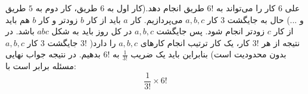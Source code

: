         \p
علی
$6$
کار را می‌تواند به
$6!$
طریق انجام دهد.(کار اول به
$6$
طریق، کار دوم به
$5$
طریق و ...) حال به جایگشت
$3$
کار
$a, b, c$
می‌پردازیم. کار
$a$
باید از کار
$b$
زودتر و کار
$b$
هم باید از کار
$c$
زودتر انجام شود. پس جایگشت
$a, b, c$
در کل روز باید به شکل
$abc$
باشد. در نتیجه از هر
$3!$
کار، یک کار ترتیب انجام کارهای
$a, b, c$
را دارد(
$3!$
جایگشت
$3$
کار
$a, b, c$
بدون محدودیت است) بنابراین باید یک ضریب
$\frac{1}{3!}$
به
$6!$
بدهیم. در نتیجه جواب نهایی مسئله برابر است با:
$$\frac{1}{3!} \times 6!$$